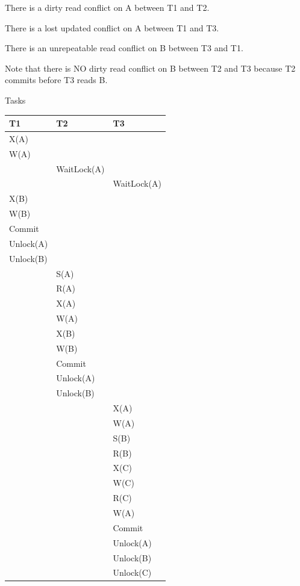 \documentclass{beamer}
\begin{document}
\begin{slide}{
	\item There is a dirty read conflict on A between T1 and T2.
	\item There is a lost updated conflict on A between T1 and T3.
	\item There is an unrepeatable read conflict on B between T3 and T1.
	\item Note that there is NO dirty read conflict on B between T2 and T3 because T2 commits before T3 reads B.
}\end{slide}

\begin{frame}[fragile]{Tasks}
	\begin{table}
		\tiny
		\begin{tabular}{l|l|l}
			T1 & T2 & T3\\
			\hline
			X(A) & & \\
			W(A) & & \\
			& WaitLock(A) &\\
			& & WaitLock(A) \\
			X(B) & & \\
			W(B) & & \\
			Commit & & \\
			Unlock(A) & & \\
			Unlock(B) & & \\
			& S(A) & \\
			& R(A) & \\
			& X(A) & \\
			& W(A) & \\
			& X(B) & \\
			& W(B) & \\
			& Commit & \\
			& Unlock(A) & \\
			& Unlock(B) & \\
			& & X(A) \\
			& & W(A) \\
			& & S(B) \\
			& & R(B) \\
			& & X(C) \\
			& & W(C) \\
			& & R(C) \\
			& & W(A) \\
			& & Commit\\
			& & Unlock(A) \\
			& & Unlock(B) \\
			& & Unlock(C) \\	
		\end{tabular}
	\end{table}	
\end{frame}	
	
\end{document}
